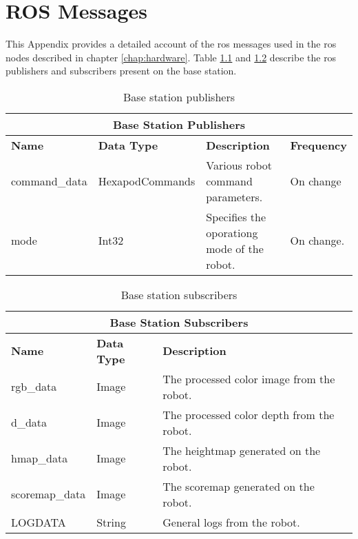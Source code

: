 \chapter{ROS Messages}
    This Appendix provides a detailed account of the \ac{ros} messages used in the \ac{ros} nodes described in chapter \ref{chap:hardware}. Table \ref{tab:base_pubs} and \ref{tab:base_subs} describe the \ac{ros} publishers and subscribers present on the base station.
    \begin{table}[h]
        \centering
        \begin{tabularx}{\textwidth}{| l | l | X | l |}
            \hline
            \multicolumn{4}{|c|}{\textbf{Base Station Publishers}} \\ \hline
            \textbf{Name} & \textbf{Data Type} & \textbf{Description} & \textbf{Frequency} \\ \hline
            command\_data & HexapodCommands & Various robot command parameters. & On change \\ \hline
            mode & Int32 & Specifies the oporationg mode of the robot. & On change. \\ \hline
        \end{tabularx}
        \caption{Base station publishers}
        \label{tab:base_pubs}
    \end{table}
    \begin{table}[h]
        \centering
        \begin{tabularx}{\textwidth}{| l | l | X |}
            \hline
            \multicolumn{3}{|c|}{\textbf{Base Station Subscribers}} \\ \hline
            \textbf{Name} & \textbf{Data Type} & \textbf{Description} \\ \hline
            rgb\_data & Image & The processed color image from the robot. \\ \hline
            d\_data & Image & The processed color depth from the robot. \\ \hline
            hmap\_data & Image & The heightmap generated on the robot. \\ \hline
            scoremap\_data & Image & The scoremap generated on the robot. \\ \hline
            LOGDATA & String & General logs from the robot. \\ \hline
        \end{tabularx}
        \caption{Base station subscribers}
        \label{tab:base_subs}
    \end{table}

